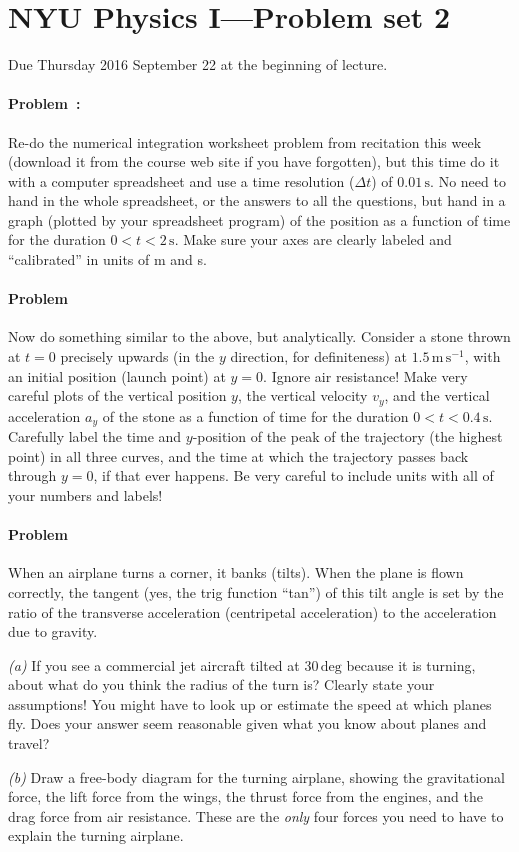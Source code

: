\documentclass[12pt]{article}
\newcommand{\s}{\mathrm{s}}
\renewcommand{\deg}{\mathrm{deg}}
\newcommand{\mps}{\mathrm{m}\,\mathrm{s}^{-1}}
\begin{document}
\thispagestyle{empty}

\section*{NYU Physics I---Problem set 2}

Due Thursday 2016 September 22 at the beginning of lecture.

\paragraph{Problem~\theproblem:}%
Re-do the numerical integration worksheet problem from recitation this
week (download it from the course web site if you have forgotten), but
this time do it with a computer spreadsheet and use a time resolution
($\Delta t$) of $0.01\,\s$.  No need to hand in the whole spreadsheet,
or the answers to all the questions, but hand in a graph (plotted by
your spreadsheet program) of the position as a function of time for
the duration $0<t<2\,\s$.  Make sure your axes are clearly labeled and
``calibrated'' in units of m and s.

\paragraph{Problem~\theproblem}%
Now do something similar to the above, but analytically.  Consider a
stone thrown at $t=0$ precisely upwards (in the $y$ direction, for
definiteness) at $1.5\,\mps$, with an initial position (launch point)
at $y=0$.  Ignore air resistance!  Make very careful plots of the
vertical position $y$, the vertical velocity $v_y$, and the vertical
acceleration $a_y$ of the stone as a function of time for the duration
$0<t<0.4\,\s$.  Carefully label the time and $y$-position of
the peak of the trajectory (the highest point) in all three curves,
and the time at which the trajectory passes back through $y=0$, if
that ever happens. Be very careful to include units with all of your
numbers and labels!

\paragraph{Problem~\theproblem}%
When an airplane turns a corner, it banks (tilts). When the plane is
flown correctly, the tangent (yes, the trig function ``tan'') of this
tilt angle is set by the ratio of the transverse acceleration
(centripetal acceleration) to the acceleration due to gravity.

\textsl{(a)} If you see a commercial jet aircraft tilted at $30\,\deg$
because it is turning, about what do you think the radius of the turn
is? Clearly state your assumptions! You might have to look up or
estimate the speed at which planes fly. Does your answer seem
reasonable given what you know about planes and travel?

\textsl{(b)} Draw a free-body diagram for the turning airplane,
showing the gravitational force, the lift force from the wings, the
thrust force from the engines, and the drag force from air resistance.
These are the \emph{only} four forces you need to have to explain
the turning airplane.
\end{document}
